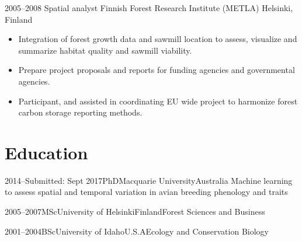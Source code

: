 \documentclass[11pt,a4paper,sans]{moderncv}        %
\begin{document}
\cventry
  {2005--2008}
  {Spatial analyst}
  {Finnish Forest Research Institute (METLA)}
  {Helsinki, Finland}
  {}
  {\begin{itemize}
  \item Integration of forest growth data and sawmill location to assess, visualize and summarize habitat quality and sawmill viability. 
  \item Prepare project proposals and reports for funding agencies and governmental agencies.
  \item Participant, and assisted in coordinating EU wide project to harmonize forest carbon storage reporting methods. 
  \end{itemize}
  }

\section{Education}

\cventry
    {2014--Submitted: Sept 2017}{PhD}{Macquarie University}{Australia}
    {Machine learning to assess spatial and temporal variation in avian breeding phenology and traits}{}
    
\cventry
    {2005--2007}{MSc}{University of Helsinki}{Finland}{Forest Sciences and Business}{}

\cventry
    {2001--2004}{BSc}{University of Idaho}{U.S.A}{Ecology and Conservation Biology}{}

% 
% 
\end{document}
